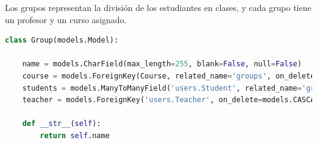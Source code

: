 Los grupos representan la división de los estudiantes en clases, y cada grupo tiene un profesor y un curso asignado.

  \begin{lstlisting}[language=Python]
class Group(models.Model):

    name = models.CharField(max_length=255, blank=False, null=False)
    course = models.ForeignKey(Course, related_name='groups', on_delete=models.CASCADE)
    students = models.ManyToManyField('users.Student', related_name='groups')
    teacher = models.ForeignKey('users.Teacher', on_delete=models.CASCADE)
    
    def __str__(self):
        return self.name
    \end{lstlisting}

